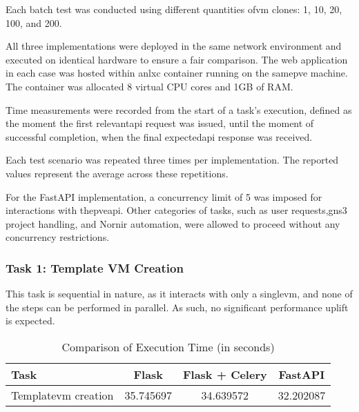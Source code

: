     Each batch test was conducted using different quantities of\ac{vm} clones: 1, 10, 20, 100, and 200. 

    All three implementations were deployed in the same network environment and executed on identical hardware to ensure 
    a fair comparison. The web application in each case was hosted within an\ac{lxc} container running on the same\ac{pve} 
    machine. The container was allocated 8 virtual CPU cores and 1GB of RAM.

    Time measurements were recorded from the start of a task's execution, defined as the moment the first relevant\ac{api} 
    request was issued, until the moment of successful completion, when the final expected\ac{api} 
    response was received.

    Each test scenario was repeated three times per implementation. The reported values represent the average across 
    these repetitions.

    For the FastAPI implementation, a concurrency limit of 5 was imposed for interactions with the\ac{pve}\ac{api}. 
    Other categories of tasks, such as user requests,\ac{gns3} project handling, and Nornir automation, were allowed to 
    proceed without any concurrency restrictions.

        \subsubsection{Task 1: Template VM Creation}

            This task is sequential in nature, as it interacts with only a single\ac{vm}, and none of the steps can be performed in 
            parallel. As such, no significant performance uplift is expected.

            \begin{table}[ht]
                \centering
                \caption{Comparison of Execution Time (in seconds)}
                \begin{tabular}{|l|c|c|c|}
                    \hline
                    \textbf{Task} & \textbf{Flask} & \textbf{Flask + Celery} & \textbf{FastAPI} \\
                    \hline
                    Template\ac{vm} creation & 35.745697 & 34.639572 & 32.202087 \\
                    \hline
                \end{tabular}
                \label{tab:task1_plot}
            \end{table}

